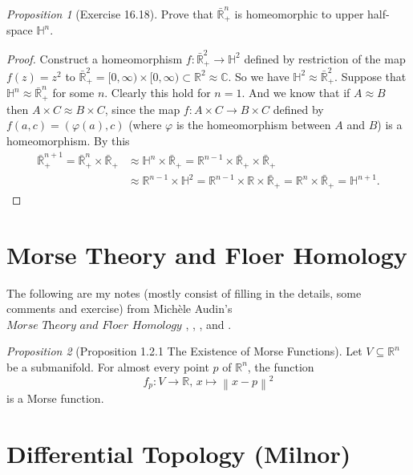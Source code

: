 \documentclass[a4paper]{article}
\theoremstyle{remark}
\newtheorem{prop}{Proposition}
\newcommand{\er}{\mathbb{R}} %
\newcommand{\rn}{\mathbb{R}^n} %
\newcommand{\hn}{\mathbb{H}^n} %
\newcommand{\subhim}{\subseteq} %
\newcommand\norm[1]{\left\lVert#1\right\rVert} %
\begin{document}
\begin{prop}[Exercise 16.18]
	Prove that $\bar{\mathbb{R}}^n_+$ is homeomorphic to upper half-space $\hn$.
\end{prop}
\begin{proof}
	Construct a homeomorphism $f : \bar{\mathbb{R}}_+^2 \to \mathbb{H}^2$ defined by restriction of the map $f(z) = z^2$ to $\bar{\mathbb{R}}_+^2=[0,\infty) \times [0,\infty) \subset \mathbb{R}^2 \approx \mathbb{C}$. So we have $\mathbb{H}^2\approx \bar{\mathbb{R}}^2_+$.
	Suppose that $\mathbb{H}^n\approx \bar{\mathbb{R}}^n_+$ for some $n$. Clearly this hold for $n=1$. And 	we know that if $A \approx B$ then $A \times C \approx B \times C$, since the map $f : A \times C \to B \times C$ defined by $f(a,c) = (\varphi(a),c)$ (where $\varphi$ is the homeomorphism between $A$ and $B$) is a homeomorphism. By this
	\begin{align*}
	\bar{\mathbb{R}}^{n+1}_+ = \bar{\mathbb{R}}^{n}_+ \times \bar{\mathbb{R}}_+ &\approx \mathbb{H}^n \times \bar{\mathbb{R}}_+ = \mathbb{R}^{n-1} \times \bar{\mathbb{R}}_+ \times \bar{\mathbb{R}}_+  \\ &\approx \mathbb{R}^{n-1} \times \mathbb{H}^2 = \mathbb{R}^{n-1} \times \mathbb{R} \times  \bar{\mathbb{R}}_+ = \mathbb{R}^n \times \bar{\mathbb{R}}_+ = \mathbb{H}^{n+1}.
	\end{align*}
\end{proof}
\section{Morse Theory and Floer Homology}
The following are my notes (mostly consist of filling in the details, some comments and exercise) from Mich\`ele Audin's $\textit{Morse Theory and Floer Homology}$ \cite{Audin}, \cite{BH}, \cite{MilnorM}, and \cite{YukioM}.


\begin{prop}[Proposition 1.2.1 \cite{Audin} The Existence of Morse Functions]
Let $V \subhim \rn$ be a submanifold. For almost every point $p$ of $\rn$, the function 
$$
f_p : V \to \er, \, x  \mapsto \norm{x-p}^2
$$
is a Morse function.
\end{prop}



\section{Differential Topology (Milnor)}
\end{document}
